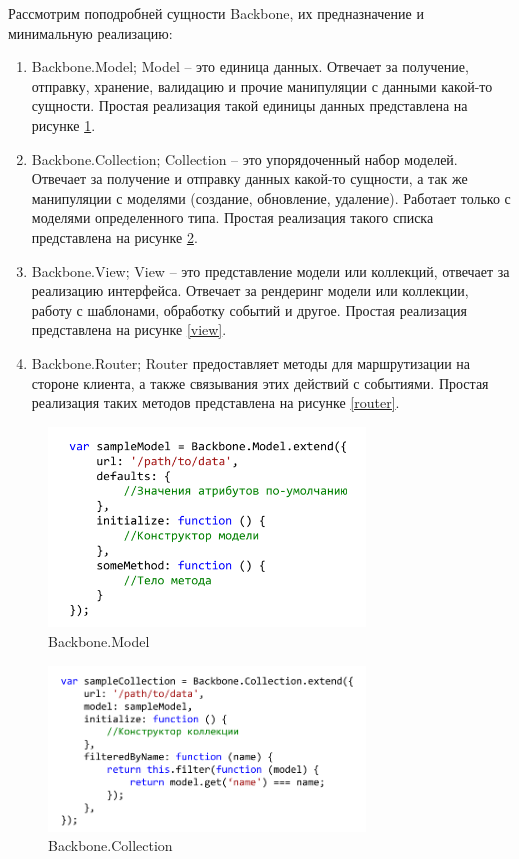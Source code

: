 Рассмотрим поподробней сущности Backbone, их предназначение и минимальную реализацию:
\begin{enumerate}
\item Backbone.Model; Model  -- это единица данных. Отвечает за получение, отправку, хранение, валидацию и прочие манипуляции с данными какой-то сущности. Простая реализация такой единицы данных представлена на рисунке \ref{modal}.

\item Backbone.Collection; Collection -- это упорядоченный набор  моделей. Отвечает за получение и отправку данных какой-то сущности, а так же манипуляции с моделями (создание, обновление, удаление). Работает только с моделями определенного типа. Простая реализация такого списка представлена на рисунке \ref{collection}.

\item Backbone.View; View -- это представление модели или коллекций, отвечает за реализацию интерфейса. Отвечает за рендеринг модели или коллекции, работу с шаблонами, обработку событий и другое. Простая реализация представлена на рисунке \ref{view}.

\item Backbone.Router; Router предоставляет методы для маршрутизации на стороне клиента, а также связывания этих действий с событиями. Простая реализация таких методов представлена на рисунке \ref{router}.

\end{enumerate}

\begin{figure}[ht]
\center\includegraphics[width=0.75\textwidth]{model}
\caption{Backbone.Model}\label{modal}
\end{figure}

\begin{figure}[ht]
\center\includegraphics[width=0.75\textwidth]{collection}
\caption{Backbone.Collection}\label{collection}
\end{figure}


